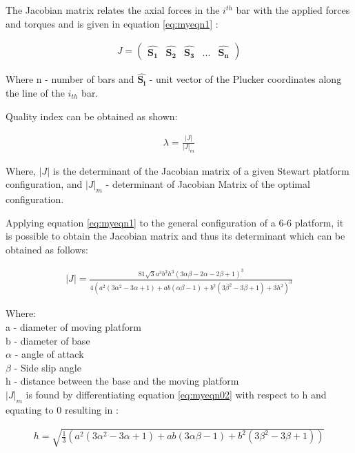  The Jacobian matrix relates the axial forces in the $i^{th}$ bar with the applied
 forces and torques and is given in equation \eqref{eq:myeqn1} \cite{fernandes_design_nodate}:
 
 \begin{ceqn}
 	\begin{align}
 		J =
 		\begin{pmatrix}
 		\hat{\boldsymbol{S_{1}}} & \hat{\boldsymbol{S_{2}}} & \hat{\boldsymbol{S_{3}}} & ... & \hat{\boldsymbol{S_{n}}}
 		\end{pmatrix}
 		\label{eq:myeqn1}
 	\end{align}
 \end{ceqn}
 
 Where n - number of bars and $ \hat{\boldsymbol{S_{i}}}$ - unit vector of the Plucker coordinates along the line of the
 $i_{th}$ bar.
 
 Quality index can be obtained as shown:
 \begin{ceqn}
 	\begin{align}
 		\lambda = \frac{|J|}{|J|_{m}}
 		\label{eq:myeqn}			
 	\end{align}
 \end{ceqn}
 Where, $|J|$ is the determinant of the Jacobian matrix of a given Stewart platform configuration, and $ |J|_{m} $ - determinant of Jacobian Matrix of the optimal configuration.
 
 Applying equation \eqref{eq:myeqn1} to the general configuration of a 6-6 platform, it is
 possible to obtain the Jacobian matrix and thus its determinant which can be obtained as follows:
 \begin{ceqn}
 	\begin{align}
 		|J| =
 \frac{81 \sqrt{3} a^3 b^3 h^3 (3 \alpha \beta - 2 \alpha - 2 \beta +1)^3}{4(a^2(3 \alpha^2 - 3 \alpha + 1)+ ab(\alpha \beta - 1 )+ b^2(3 \beta^2 - 3 \beta + 1)+ 3h^2)^3}
 \label{eq:myeqn02}
 	\end{align}
 \end{ceqn}
 Where:\\
 a - diameter of moving platform\\
 b - diameter of base\\
 $\alpha$ - angle of attack\\
 $ \beta $ - Side slip angle\\
 h - distance between the base and the moving platform\\
 
 $|J|_{m}$ is found by differentiating equation \eqref{eq:myeqn02} with respect to h and equating to 0 resulting in \cite{fernandes_design_nodate}:
 \begin{ceqn}
 \begin{align}
 	h = \sqrt{\frac{1}{3}(a^2 (3 \alpha^2 - 3 \alpha + 1)+ ab (3\alpha\beta - 1)+b^2(3 \beta^2 - 3 \beta + 1))}
 	\label{eq:myeqn}
 \end{align}
 \end{ceqn}


